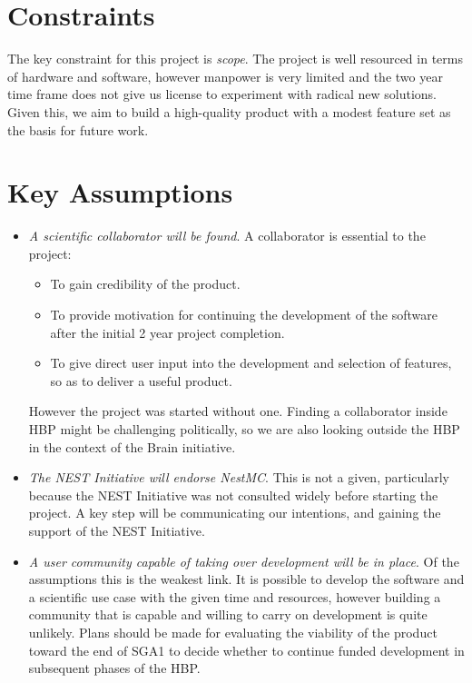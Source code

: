 \documentclass[11pt,a4paper]{article}
\begin{document}
\section{Constraints}

The key constraint for this project is \emph{scope}.
The project is well resourced in terms of hardware and software, however manpower is very limited and the two year time frame does not give us license to experiment with radical new solutions.
Given this, we aim to build a high-quality product with a modest feature set as the basis for future work.

\section{Key Assumptions}

\begin{itemize}
    \item \emph{A scientific collaborator will be found}.
    A collaborator is essential to the project:
    \begin{itemize}
        \item To gain credibility of the product.
        \item To provide motivation for continuing the development of the software after the initial 2 year project completion.
        \item To give direct user input into the development and selection of features, so as to deliver a useful product.
    \end{itemize}
    However the project was started without one. Finding a collaborator inside HBP might be challenging politically, so we are also looking outside the HBP in the context of the Brain initiative.
    \item \emph{The NEST Initiative will endorse NestMC}. This is not a given, particularly because the NEST Initiative was not consulted widely before starting the project. A key step will be communicating our intentions, and gaining the support of the NEST Initiative.
    \item \emph{A user community capable of taking over development will be in place}.
    Of the assumptions this is the weakest link.
    It is possible to develop the software and a scientific use case with the given time and resources, however building a community that is capable and willing to carry on development is quite unlikely.
    Plans should be made for evaluating the viability of the product toward the end of SGA1 to decide whether to continue funded development in subsequent phases of the HBP.

\end{itemize}
\end{document}
